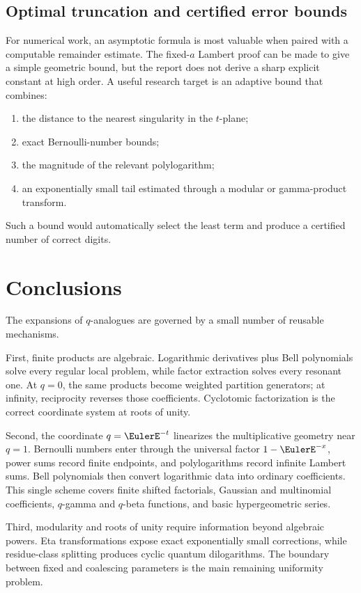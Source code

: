\documentclass[11pt,oneside]{article}
\theoremstyle{definition}
\theoremstyle{remark}
\let\reporttopsection\section
\let\reportsubsection\subsection
\let\chapter\reporttopsection
\let\section\reportsubsection
\begin{document}
\section{Optimal truncation and certified error bounds}

For numerical work, an asymptotic formula is most valuable when paired with a
computable remainder estimate.  The fixed-$a$ Lambert proof can be made to
give a simple geometric bound, but the report does not derive a sharp explicit
constant at high order.  A useful
research target is an adaptive bound that combines:
\begin{enumerate}[label=\textup{(\roman*)}]
\item the distance to the nearest singularity in the $t$-plane;
\item exact Bernoulli-number bounds;
\item the magnitude of the relevant polylogarithm;
\item an exponentially small tail estimated through a modular or gamma-product
      transform.
\end{enumerate}
Such a bound would automatically select the least term and produce a certified
number of correct digits.

\chapter{Conclusions}

The expansions of $q$-analogues are governed by a small number of reusable
mechanisms.

First, finite products are algebraic.  Logarithmic derivatives plus Bell
polynomials solve every regular local problem, while factor extraction solves
every resonant one.  At $q=0$, the same products become weighted partition
generators; at infinity, reciprocity reverses those coefficients.  Cyclotomic
factorization is the correct coordinate system at roots of unity.

Second, the coordinate $q=\EulerE^{-t}$ linearizes the multiplicative geometry near
$q=1$.  Bernoulli numbers enter through the universal factor
$1-\EulerE^{-x}$, power sums record finite endpoints, and polylogarithms record
infinite Lambert sums.  Bell polynomials then convert logarithmic data into
ordinary coefficients.  This single scheme covers finite shifted factorials,
Gaussian and multinomial coefficients, $q$-gamma and $q$-beta functions, and
basic hypergeometric series.

Third, modularity and roots of unity require information beyond algebraic
powers.  Eta transformations expose exact exponentially small corrections,
while residue-class splitting produces cyclic quantum dilogarithms.  The
boundary between fixed and coalescing parameters is the main remaining
uniformity problem.
\end{document}

